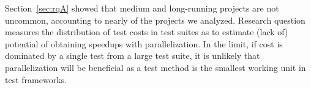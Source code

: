 Section~\ref{sec:rqA} showed that medium and long-running projects are
not uncommon, accounting to nearly \percentMedLongRunning{} of the
\numSubjs{} projects we analyzed.  Research question \numRQFeasibilityTwo{}
measures the distribution of test costs in test suites as to estimate
(lack of) potential of obtaining speedups with parallelization.  In
the limit, if cost is dominated by a single test from a large test
suite, it is unlikely that parallelization will be beneficial as a
test method is the smallest working unit in test frameworks.






